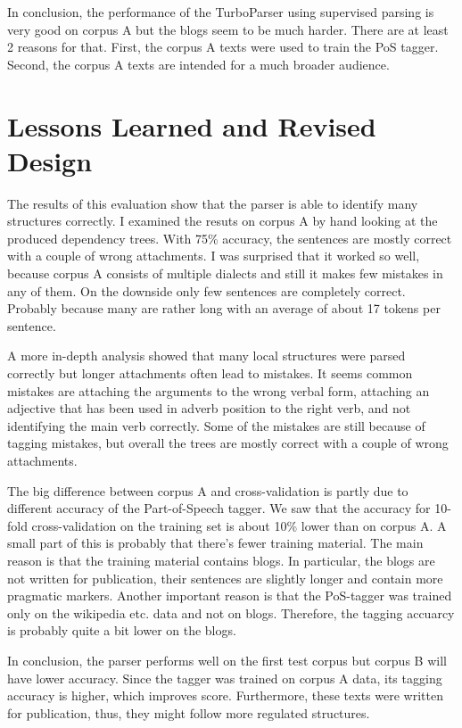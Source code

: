 \documentclass[11pt,letterpaper, covington]{article}
\begin{document}
In conclusion, the performance of the TurboParser using supervised parsing is very good on corpus A but the blogs seem to be much harder. There are at least 2 reasons for that. First, the corpus A texts were used to train the PoS tagger. Second, the corpus A texts are intended for a much broader audience. 

\section{Lessons Learned and Revised Design}

The results of this evaluation show that the parser is able to identify many structures correctly. I examined the resuts on corpus A by hand looking at the produced dependency trees. With 75\% accuracy, the sentences are mostly correct with a couple of wrong attachments. I was surprised that it worked so well, because corpus A consists of multiple dialects and still it makes few mistakes in any of them. On the downside only few sentences are completely correct. Probably because many are rather long with an average of about 17 tokens per sentence. 

A more in-depth analysis showed that many local structures were parsed correctly but longer attachments often lead to mistakes. It seems common mistakes are attaching the arguments to the wrong verbal form, attaching an adjective that has been used in adverb position to the right verb, and not identifying the main verb correctly. Some of the mistakes are still because of tagging mistakes, but overall the trees are mostly correct with a couple of wrong attachments. 

The big difference between corpus A and cross-validation is partly due to different accuracy of the Part-of-Speech tagger. We saw that the accuracy for 10-fold cross-validation on the training set is about 10\% lower than on corpus A. A small part of this is probably that there's fewer training material. The main reason is that the training material contains blogs. In particular, the blogs are not written for publication, their sentences are slightly longer and contain more pragmatic markers. Another important reason is that the PoS-tagger was trained only on the wikipedia etc. data and not on blogs. Therefore, the tagging accuarcy is probably quite a bit lower on the blogs. 

In conclusion, the parser performs well on the first test corpus but corpus B will have lower accuracy. Since the tagger was trained on corpus A data, its tagging accuracy is higher, which improves score. Furthermore, these texts were written for publication, thus, they might follow more regulated structures. 
\end{document}
